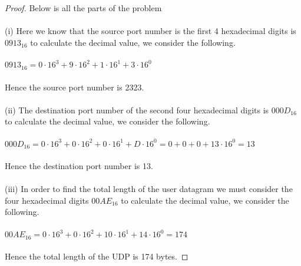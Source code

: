 \documentclass[12pt]{article}
\begin{document}
\begin{proof}
Below is all the parts of the problem \\ \\
(i) Here we know that the source port number is the first 4 hexadecimal digits is $0913_{16}$ to calculate the decimal value, we consider the following. \\ \\
$0913_{16}= 0 \cdot 16^3 + 9 \cdot 16^2 + 1 \cdot 16^1 + 3 \cdot 16^0$ \\ \\ 
Hence the source port number is 2323. \\ \\
(ii) The destination port number of the second four hexadecimal digits is $000D_{16}$
to calculate the decimal value, we consider the following. \\ \\
$000D_{16} = 0 \cdot 16^3 + 0 \cdot 16^2 + 0 \cdot 16^1 + D \cdot 16^0 = 0 + 0 + 0 + 13 \cdot  16^0 = 13$ \\ \\
Hence the destination port number is 13.\\ \\
(iii) In order to find the total length of the user datagram we must consider the four hexadecimal digits $00AE_{16}$ to calculate the decimal value, we consider the following. \\ \\
$00AE_{16} = 0 \cdot 16^3 + 0 \cdot 16^2 + 10 \cdot 16^1 + 14 \cdot 16^0 =174$ \\ \\
Hence the total length of the UDP is 174 bytes.
\end{proof}
\end{document}
